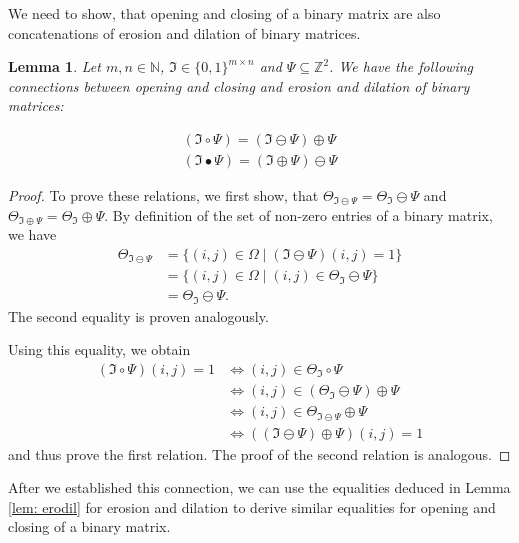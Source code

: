 \documentclass[a4paper,12pt]{article}
\theoremstyle{plain}
\newtheorem{lemma}[theorem]{Lemma}
\theoremstyle{definition}
\numberwithin{equation}{section}
\begin{document}
We need to show, that opening and closing of a binary matrix are also concatenations of erosion and dilation of binary matrices.

\begin{lemma}
	Let $m, n \in \mathbb{N}$, $\mathfrak{I} \in \{ 0, 1 \}^{m \times n}$ and $\Psi \subseteq \mathbb{Z}^2$. We have the following connections between opening and closing and erosion and dilation of binary matrices:
	\begin{samepage}
		\begin{align}
			(\mathfrak{I} \circ \Psi) = (\mathfrak{I} \ominus \Psi) \oplus \Psi \\
			(\mathfrak{I} \bullet \Psi) = (\mathfrak{I} \oplus \Psi) \ominus \Psi
		\end{align}
	\end{samepage}
\end{lemma}
\begin{proof}
	To prove these relations, we first show, that $\Theta_{\mathfrak{I} \ominus \Psi} = \Theta_\mathfrak{I} \ominus \Psi$ and $\Theta_{\mathfrak{I} \oplus \Psi} = \Theta_\mathfrak{I} \oplus \Psi$. By definition of the set of non-zero entries of a binary matrix, we have
	\begin{align*}
		\Theta_{\mathfrak{I} \ominus \Psi} &= \{ (i, j) \in \Omega \mid (\mathfrak{I} \ominus \Psi)(i, j) = 1 \} \\
		&= \{ (i, j) \in \Omega \mid (i, j) \in \Theta_\mathfrak{I} \ominus \Psi \} \\
		&= \Theta_\mathfrak{I} \ominus \Psi.
	\end{align*}
	The second equality is proven analogously.
	
	Using this equality, we obtain
	\begin{align*}
		(\mathfrak{I} \circ \Psi)(i, j) = 1 &\Leftrightarrow (i, j) \in \Theta_\mathfrak{I} \circ \Psi \\
		&\Leftrightarrow (i, j) \in (\Theta_\mathfrak{I} \ominus \Psi) \oplus \Psi \\
		&\Leftrightarrow (i, j) \in \Theta_{\mathfrak{I} \ominus \Psi} \oplus \Psi \\
		&\Leftrightarrow ((\mathfrak{I} \ominus \Psi) \oplus \Psi)(i, j) = 1
	\end{align*}
	and thus prove the first relation. The proof of the second relation is analogous.
\end{proof}

After we established this connection, we can use the equalities deduced in Lemma \ref{lem: erodil} for erosion and dilation to derive similar equalities for opening and closing of a binary matrix.
\end{document}
